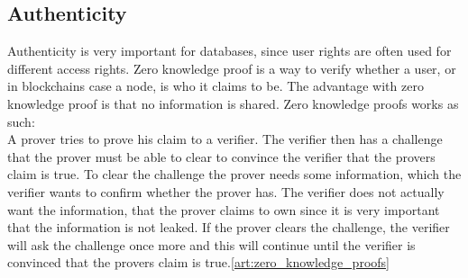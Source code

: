 \subsection{Authenticity}
Authenticity is very important for databases, since user rights are often used for different access rights. Zero knowledge proof is a way to verify whether a user, or in blockchains case a node, is who it claims to be. The advantage with zero knowledge proof is that no information is shared. Zero knowledge proofs works as such:\\
A prover tries to prove his claim to a verifier. The verifier then has a challenge that the prover must be able to clear to convince the verifier that the provers claim is true. To clear the challenge the prover needs some information, which the verifier wants to confirm whether the prover has. The verifier does not actually want the information, that the prover claims to own since it is very important that the information is not leaked. If the prover clears the challenge, the verifier will ask the challenge once more and this will continue until the verifier is convinced that the provers claim is true.\ref{art:zero_knowledge_proofs}



